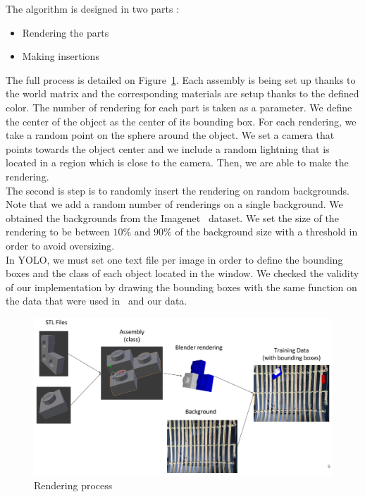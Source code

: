 \documentclass[10pt,twocolumn,letterpaper]{article}
\begin{document}
The algorithm is designed in two parts : 
\begin{itemize}
 \item Rendering the parts
 \item Making insertions
\end{itemize}
The full process is detailed on Figure~\ref{render}.
Each assembly is being set up thanks to the world matrix and the corresponding materials are setup thanks 
to the defined color.
The number of rendering for each part is taken as a parameter. We define the center of the object as the 
center of its bounding box. For each rendering, we take a random point on the sphere around the object. We 
set a camera that points towards the object center and we include a random lightning that is located in a 
region which is close to the camera. Then, we are able to make the rendering. \\
The second is step is to randomly insert the rendering on random backgrounds. Note that we add a random 
number of renderings on a single background. We obtained the backgrounds 
from the Imagenet~\cite{imagenet_cvpr09} dataset. We set the size of the rendering to be between $10\%$ and 
$90\%$ of the background size with a threshold in order to avoid oversizing. \\
In YOLO, we must set one text file per image in order to define the bounding boxes and the class of each 
object located in the window. We checked the validity of our implementation by drawing the bounding boxes with 
the same function on the data that were used in~\cite{redmon_you_2015} and our data.


\begin{figure}
 \centering
 \includegraphics[scale=0.12]{DataGener}
 \caption{Rendering process}
 \label{render}
\end{figure}
\end{document}
